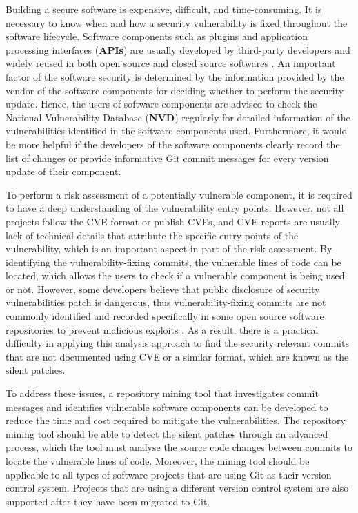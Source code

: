 \documentclass[12pt, a4paper]{report}
\begin{document}
Building a secure software is expensive, difficult, and time-consuming. It is necessary to know when
and how a security vulnerability is fixed throughout the software lifecycle. Software components
such as plugins and application processing interfaces (\textbf{APIs}) are usually developed by
third-party developers and widely reused in both open source and closed source softwares
\cite{khan_2001}. An important factor of the software security is determined by the information
provided by the vendor of the software components for deciding whether to perform the security
update. Hence, the users of software components are advised to check the National Vulnerability
Database (\textbf{NVD}) \cite{nvd} regularly for detailed information of the vulnerabilities
identified in the software components used. Furthermore, it would be more helpful if the developers
of the software components clearly record the list of changes or provide informative Git commit
messages for every version update of their component.

To perform a risk assessment of a potentially vulnerable component, it is required to have a deep
understanding of the vulnerability entry points. However, not all projects follow the CVE format or
publish CVEs, and CVE reports are usually lack of technical details that attribute the specific
entry points of the vulnerability, which is an important aspect in part of the risk assessment. By
identifying the vulnerability-fixing commits, the vulnerable lines of code can be located, which
allows the users to check if a vulnerable component is being used or not. However, some developers
believe that public disclosure of security vulnerabilities patch is dangerous, thus
vulnerability-fixing commits are not commonly identified and recorded specifically in some open
source software repositories to prevent malicious exploits \cite{arora_2005}. As a result, there is
a practical difficulty in applying this analysis approach to find the security relevant commits that
are not documented using CVE or a similar format, which are known as the silent patches.

To address these issues, a repository mining tool that investigates commit messages and identifies
vulnerable software components can be developed to reduce the time and cost required to mitigate the
vulnerabilities. The repository mining tool should be able to detect the silent patches through an
advanced process, which the tool must analyse the source code changes between commits to locate the
vulnerable lines of code. Moreover, the mining tool should be applicable to all types of software
projects that are using Git as their version control system. Projects that are using a different
version control system are also supported after they have been migrated to Git.
\end{document}
